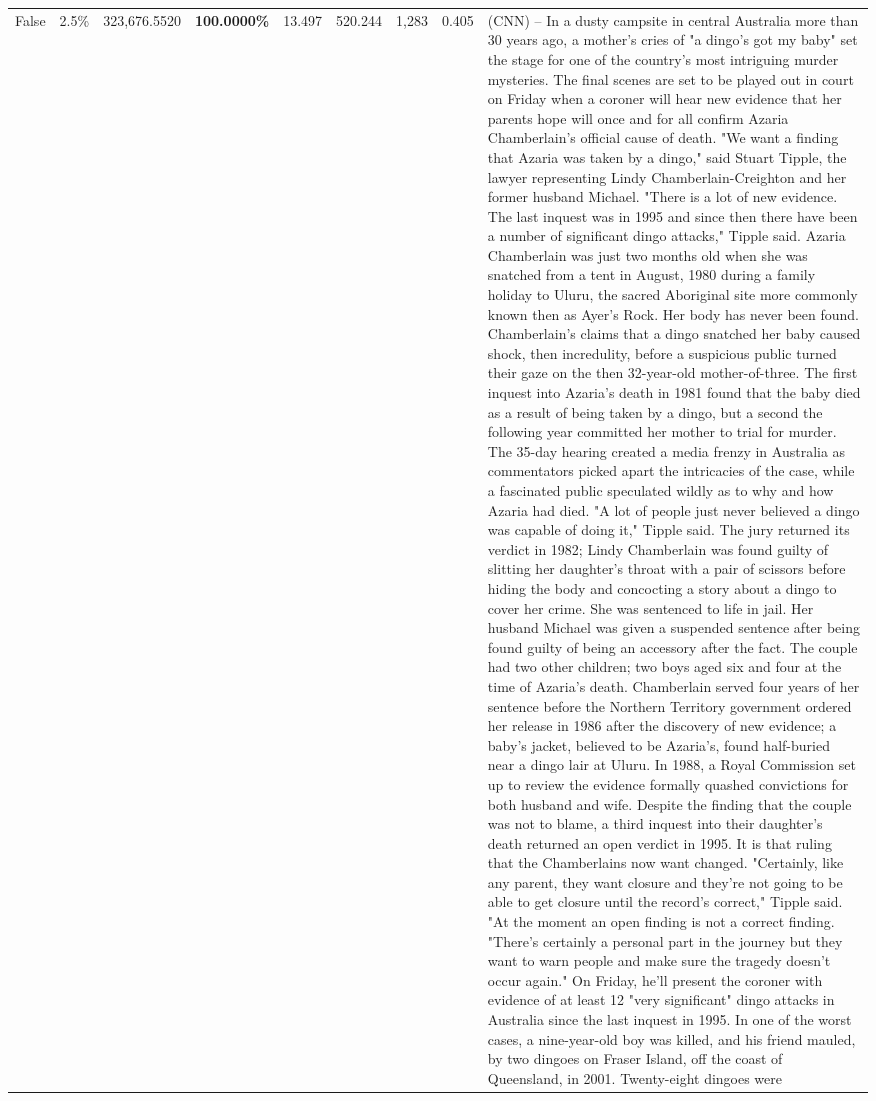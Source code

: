 \begin{table}[H]
\begin{tabular}{lllrlllll}
False & 2.5\% & 323,676.5520 & \bfseries \color{red} 100.0000\% & 13.497 & 520.244 & 1,283 & 0.405 & (CNN) -- In a dusty campsite in central Australia more than 30 years ago, a mother's cries of "a dingo's got my baby" set the stage for one of the country's most intriguing murder mysteries. The final scenes are set to be played out in court on Friday when a coroner will hear new evidence that her parents hope will once and for all confirm Azaria Chamberlain's official cause of death. "We want a finding that Azaria was taken by a dingo," said Stuart Tipple, the lawyer representing Lindy Chamberlain-Creighton and her former husband Michael. "There is a lot of new evidence. The last inquest was in 1995 and since then there have been a number of significant dingo attacks," Tipple said. Azaria Chamberlain was just two months old when she was snatched from a tent in August, 1980 during a family holiday to Uluru, the sacred Aboriginal site more commonly known then as Ayer's Rock. Her body has never been found. Chamberlain's claims that a dingo snatched her baby caused shock, then incredulity, before a suspicious public turned their gaze on the then 32-year-old mother-of-three. The first inquest into Azaria's death in 1981 found that the baby died as a result of being taken by a dingo, but a second the following year committed her mother to trial for murder. The 35-day hearing created a media frenzy in Australia as commentators picked apart the intricacies of the case, while a fascinated public speculated wildly as to why and how Azaria had died. "A lot of people just never believed a dingo was capable of doing it," Tipple said. The jury returned its verdict in 1982; Lindy Chamberlain was found guilty of slitting her daughter's throat with a pair of scissors before hiding the body and concocting a story about a dingo to cover her crime. She was sentenced to life in jail. Her husband Michael was given a suspended sentence after being found guilty of being an accessory after the fact. The couple had two other children; two boys aged six and four at the time of Azaria's death. Chamberlain served four years of her sentence before the Northern Territory government ordered her release in 1986 after the discovery of new evidence; a baby's jacket, believed to be Azaria's, found half-buried near a dingo lair at Uluru. In 1988, a Royal Commission set up to review the evidence formally quashed convictions for both husband and wife. Despite the finding that the couple was not to blame, a third inquest into their daughter's death returned an open verdict in 1995. It is that ruling that the Chamberlains now want changed. "Certainly, like any parent, they want closure and they're not going to be able to get closure until the record's correct," Tipple said. "At the moment an open finding is not a correct finding. "There's certainly a personal part in the journey but they want to warn people and make sure the tragedy doesn't occur again." On Friday, he'll present the coroner with evidence of at least 12 "very significant" dingo attacks in Australia since the last inquest in 1995. In one of the worst cases, a nine-year-old boy was killed, and his friend mauled, by two dingoes on Fraser Island, off the coast of Queensland, in 2001. Twenty-eight dingoes were 
\end{tabular}
\end{table}
